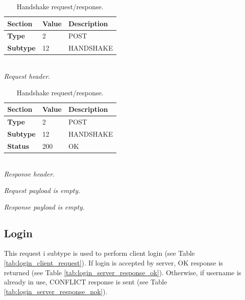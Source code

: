\documentclass[english, sem, kiv, he, iso690alph, pdf, viewonly]{fasthesis}
\begin{document}
\begin{table}[h]
	\centering
	\begin{minipage}[b]{0.45\textwidth}
		\centering
		\begin{tabular}{|l|l|l|}
			\hline
			\textbf{Section} & \textbf{Value} & \textbf{Description} \\ \hline
			\textbf{Type} & 2 & \footnotesize{POST} \\ \hline
			\textbf{Subtype} & 12 & \footnotesize{HANDSHAKE} \\ \hline
		\end{tabular} \\
		\textit{Request header.}
	\end{minipage} 
	\hfill
	\begin{minipage}[b]{0.45\textwidth}
		\centering
		\begin{tabular}{|l|l|l|}
			\hline
			\textbf{Section} & \textbf{Value} & \textbf{Description} \\ \hline
				\textbf{Type} & 2 & \footnotesize{POST} \\ \hline
			\textbf{Subtype} & 12 & \footnotesize{HANDSHAKE} \\ \hline
			\textbf{Status} & 200 & \footnotesize{OK} \\ \hline
		\end{tabular} \\
		\textit{Response header.}
	\end{minipage} \newline

	\begin{minipage}[b]{0.45\textwidth}
		\centering
		\textit{Request payload is empty.}
	\end{minipage}	
	\hfill
	\begin{minipage}[b]{0.45\textwidth}
		\centering
		\textit{Response payload is empty.}
	\end{minipage}	
	\caption{Handshake request/response.}
	\label{tab:handshake_request_response}
\end{table}

\newpage
\subsection{Login}
This request i subtype is used to perform client login (see Table \ref{tab:login_client_request}). If login is accepted by server, OK response is returned (see Table \ref{tab:login_server_response_ok}). Otherwise, if username is already in use, CONFLICT response is sent (see Table \ref{tab:login_server_response_nok}). 
\end{document}
